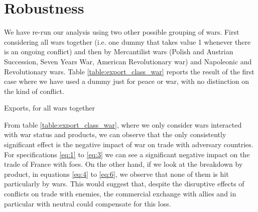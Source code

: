 \documentclass[12pt,a4paper,notitlepage,english]{article}
\begin{document}
\section{Robustness}
We have re-run our analysis using two other possible grouping of wars. First considering all wars together (i.e. one dummy that takes value 1 whenever there is an ongoing conflict) and then by  Mercantilist wars (Polish and Austrian Succession, Seven Years War, American Revolutionary war) and Napoleonic and Revolutionary wars. 
Table \ref{table:export_class_war} reports the result of the first case where we have used a dummy just for peace or war, with no distinction on the kind of conflict.
\begin{table}
\begin{center}
\caption {Exports, for all wars together} 
\label{table:export_class_war}
\renewcommand{\arraystretch}{0.6}

\end{center}
\end{table}
From table \ref{table:export_class_war}, where we only consider wars interacted with war status and products, we can observe that the only consistently significant effect is the negative impact of war on trade with adversary countries. For specifications \ref{eq:1} to \ref{eq:3} we can see a significant negative impact on the trade of France with foes. On the other hand, if we look at the breakdown by product, in equations \ref{eq:4} to \ref{eq:6}, we observe that none of them is hit particularly by wars. This would suggest that, despite the disruptive effects of conflicts on trade with enemies, the commercial exchange with allies and in particular with neutral could compensate for this loss. \\
\end{document}
